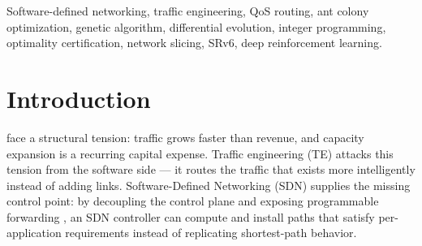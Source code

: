 \documentclass[journal]{IEEEtran}
\begin{document}
\begin{IEEEkeywords}
Software-defined networking, traffic engineering, QoS routing, ant colony
optimization, genetic algorithm, differential evolution, integer programming,
optimality certification, network slicing, SRv6, deep reinforcement learning.
\end{IEEEkeywords}

\section{Introduction}
 face a structural tension: traffic grows faster
than revenue, and capacity expansion is a recurring capital expense.
Traffic engineering (TE) attacks this tension from the software side --- it
routes the traffic that exists more intelligently instead of adding links.
Software-Defined Networking (SDN) supplies the missing control point: by
decoupling the control plane and exposing programmable forwarding
\cite{mckeown2008,kim2013,hu2014}, an SDN controller can compute and install
paths that satisfy per-application requirements instead of replicating
shortest-path behavior.
\end{document}
